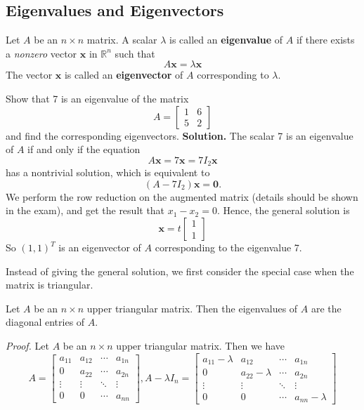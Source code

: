 \documentclass[10pt, a4paper]{article}
\newcommand{\R}{\mathbb{R}}
\newcommand{\vt}[1]{\mathbf{#1}}
\begin{document}
\subsection{Eigenvalues and Eigenvectors}
\begin{definition}
    Let $A$ be an $n \times n$ matrix. A scalar $\lambda$ is called an \textbf{eigenvalue} of $A$ if there exists a \textit{nonzero} vector $\vt{x}$ in $\R^n$ such that
    \begin{equation}
        A\vt{x} = \lambda \vt{x}
    \end{equation}
    The vector $\vt{x}$ is called an \textbf{eigenvector} of $A$ corresponding to $\lambda$.
\end{definition}
\begin{example}
    Show that 7 is an eigenvalue of the matrix
    \begin{equation}
        A = \begin{bmatrix}
            1&6\\
            5&2
        \end{bmatrix}
    \end{equation}
    and find the corresponding eigenvectors.
    \textbf{Solution.} The scalar 7 is an eigenvalue of $A$ if and only if the equation\[A\vt{x}=7\vt{x}=7I_2\vt{x}\] has a nontrivial solution, which is equivalent to 
    \begin{equation}
        (A-7I_2)\vt{x} = \vt{0}.
    \end{equation}
    We perform the row reduction on the augmented matrix (details should be shown in the exam), and get the result that $x_1-x_2=0$. Hence, the general solution is 
    \begin{equation}
        \vt{x} = t\begin{bmatrix}
            1\\
            1
        \end{bmatrix}
    \end{equation}
    So $(1,1)^T$ is an eigenvector of $A$ corresponding to the eigenvalue 7.
\end{example}
Instead of giving the general solution, we first consider the special case when the matrix is triangular.
\begin{proposition}
    Let $A$ be an $n \times n$ upper triangular matrix. Then the eigenvalues of $A$ are the diagonal entries of $A$.
\end{proposition}
\textit{Proof.} Let $A$ be an $n \times n$ upper triangular matrix. Then we have \[
A=\begin{bmatrix}
    a_{11}&a_{12}&\cdots&a_{1n}\\
    0&a_{22}&\cdots&a_{2n}\\
    \vdots&\vdots&\ddots&\vdots\\
    0&0&\cdots&a_{nn}
\end{bmatrix}
, A-\lambda I_n = \begin{bmatrix}
    a_{11}-\lambda&a_{12}&\cdots&a_{1n}\\
    0&a_{22}-\lambda&\cdots&a_{2n}\\
    \vdots&\vdots&\ddots&\vdots\\
    0&0&\cdots&a_{nn}-\lambda
\end{bmatrix}
\]
\end{document}
